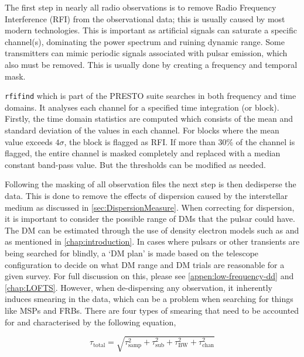 The first step in nearly all radio observations is to remove Radio Frequency Interference (RFI) from the observational data; this is usually caused by most modern technologies. This is important as artificial signals can saturate a specific channel(s), dominating the power spectrum and ruining dynamic range. Some transmitters can mimic periodic signals associated with pulsar emission, which also must be removed. This is usually done by creating a frequency and temporal mask.  

\texttt{rfifind} which is part of the PRESTO suite searches in both frequency and time domains. It analyses each channel for a specified time integration (or block). Firstly, the time domain statistics are computed which consists of the mean and standard deviation of the values in each channel. For blocks where the mean value exceeds $4\sigma$, the block is flagged as RFI. If more than 30\% of the channel is flagged, the entire channel is masked completely and replaced with a median constant band-pass value. But the thresholds can be modified as needed. 

Following the masking of all observation files the next step is then dedisperse the data. This is done to remove the effects of dispersion caused by the interstellar medium as discussed in \cref{sec:DispersionMeasure}.  When correcting for dispersion, it is important to consider the possible range of DMs that the pulsar could have. The DM can be estimated through the use of density electron models such as \cite{ocker_ne2025_2026} and \cite{yao_new_2017} as mentioned in \cref{chap:introduction}. In cases where pulsars or other transients are being searched for blindly, a `DM plan' is made based on the telescope configuration to decide on what DM range and DM trials are reasonable for a given survey. For full discussion on this, please see \cref{appen:low-frequency-dd} and \cref{chap:LOFTS}. However, when de-dispersing any observation, it inherently induces smearing in the data, which can be a problem when searching for things like MSPs and FRBs. There are four types of smearing that need to be accounted for and characterised by the following equation, 

\begin{equation}
    \tau_{\text{total}} = \sqrt{\tau_{\text{samp}}^2 + \tau_{\text{sub}}^2 + \tau_{\text{BW}}^2 + \tau_{\text{chan}}^2}
\end{equation}

